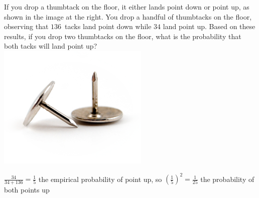 \documentclass[answers,addpoints,12pt]{exam}
\begin{document}
\begin{questions}
\begin{solution}
\end{solution}

\question[10]
\begin{multicols}{2}
If you drop a thumbtack on the floor, it either lands point down
or point up, as shown in the image at the right.
You drop a handful of thumbtacks on the floor, observing that
$136$~tacks land point down while $34$ land point up.
Based on these results, if you drop two thumbtacks on the floor, what
is the probability that both tacks will land point up?
\columnbreak\\
\includegraphics[scale=.6]{Thumbtacks}
\end{multicols}
\begin{solution}
$\frac{34}{34+136}=\frac{1}{5}$ the empirical probability
of point up, so $\left(\frac{1}{5}\right)^2=\frac{1}{25}$
the probability of both points up
\end{solution}


\end{questions}
\end{document}
